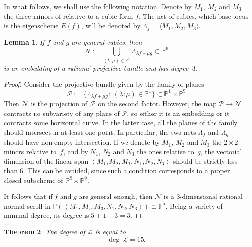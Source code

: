 \documentclass[11pt, a4paper, reqno, captions=tableheading,bibliography=totoc]{scrartcl}
\theoremstyle{plain}
\newtheorem{lemma}{Lemma}[section]
\newtheorem{theorem}[lemma]{Theorem}
\theoremstyle{definition}
\newcommand{\p}{\mathbb{P}}
\begin{document}
In what follows, we shall use the following notation.
Denote by $M_1$, $M_2$ and $M_3$ the three minors of  relative to a cubic form $f$.
The net of cubics, which base locus is the eigenscheme $E(f)$, will be denoted by $\Lambda_f = \langle M_1, M_2, M_3 \rangle$.
\begin{lemma}
\label{lemma:scroll}
 If $f$ and $g$ are general cubics, then
 \[
   \mathcal{N} := \bigcup_{(\lambda : \mu) \in \p^1} \Lambda_{\lambda f + \mu g} \subset \p^9
 \]
 is an embedding of a rational projective bundle and has degree~$3$.
\end{lemma}
\begin{proof}
Consider the projective bundle given by the family of planes
%
\[
{\mathcal P} := \{ \Lambda_{\lambda f + \mu g} \, : \, (\lambda: \mu)\in \p^1 \} \subset \p^1 \times \p^9
\]
%
Then $\mathcal{N}$ is the projection of~$\mathcal{P}$ on the second factor.
However, the map ${\mathcal P} \to {\mathcal N}$ contracts no subvariety of any plane of ${\mathcal P}$, so either it is an embedding or it contracts some horizontal curve. In the latter case, all the planes of the family should intersect in at least one point. In particular, the two nets $\Lambda_f$ and $\Lambda_g$ should have non-empty intersection.
If we denote by $M_1$, $M_2$ and $M_3$ the $2 \times 2$ minors relative to~$f$, and by $N_1$, $N_2$ and $N_3$ the ones relative to~$g$, the vectorial dimension of the linear span $\left\langle M_1, M_2, M_3, N_1, N_2, N_3 \right\rangle$ should be strictly less than $6$. This can be avoided, since such a condition corresponds to a proper closed subscheme of $\p^9 \times \p^9$.

It follows that if $f$ and $g$ are general enough, then $\mathcal{N}$ is a $3$-dimensional rational normal scroll in $\p(\left\langle M_1, M_2, M_3, N_1, N_2, N_3 \right\rangle) \cong \p^5$.
Being a variety of minimal degree, its degree is $5+1-3 = 3$.
\end{proof}

\begin{theorem}
The degree of $\mathcal L$ is equal to
\[
  \deg \ \mathcal L =  15.
\]
\end{theorem}
\end{document}
